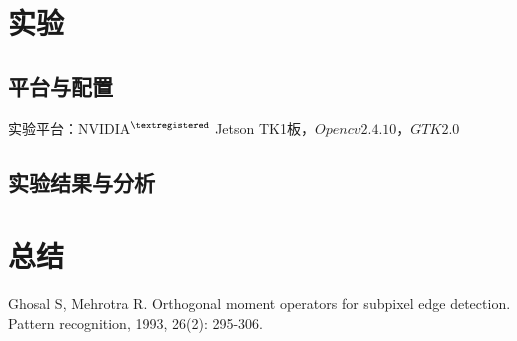 \documentclass[10pt,a4paper]{article}
\begin{document}
\section{实验}
\subsection{平台与配置}
实验平台：NVIDIA$^{\textregistered}$ Jetson TK1板，$Opencv2.4.10$，$GTK2.0$
\subsection{实验结果与分析}



\section{总结}

\begin{thebibliography}{4}
Ghosal S, Mehrotra R. Orthogonal moment operators for subpixel edge detection. Pattern recognition, 1993, 26(2): 295-306.

\end{thebibliography}
\end{document}
